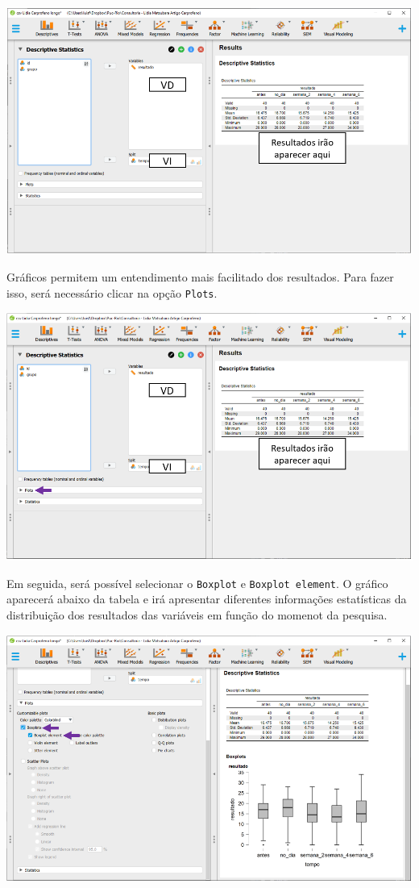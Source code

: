 \documentclass[
]{book}
\begin{document}
\includegraphics{./img/cap_lmm_descriptives3.png}

Gráficos permitem um entendimento mais facilitado dos resultados. Para fazer isso, será necessário clicar na opção \texttt{Plots}.

\includegraphics{./img/cap_lmm_plots.png}

Em seguida, será possível selecionar o \texttt{Boxplot} e \texttt{Boxplot\ element}. O gráfico aparecerá abaixo da tabela e irá apresentar diferentes informações estatísticas da distribuição dos resultados das variáveis em função do momenot da pesquisa.

\includegraphics{./img/cap_lmm_boxplots1.png}
\end{document}
